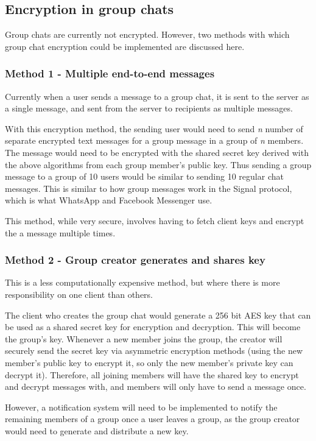 \subsection{Encryption in group chats}
\label{encryption-groups}
Group chats are currently not encrypted. However, two methods with which group chat encryption could be implemented are discussed here.

\subsubsection{Method 1 - Multiple end-to-end messages}
Currently when a user sends a message to a group chat, it is sent to the server as a single message, and sent from the server to recipients as multiple messages. 

With this encryption method, the sending user would need to send \textit{n} number of separate encrypted text messages for a group message in a group of \textit{n} members. The message would need to be encrypted with the shared secret key derived with the above algorithms from each group member's public key. Thus sending a group message to a group of 10 users would be similar to sending 10 regular chat messages. This is similar to how group messages work in the Signal protocol\cite{signal_groups}, which is what WhatsApp and Facebook Messenger use.

This method, while very secure, involves having to fetch client keys and encrypt the a message multiple times.

\subsubsection{Method 2 - Group creator generates and shares key}

This is a less computationally expensive method, but where there is more responsibility on one client than others.

The client who creates the group chat would generate a 256 bit AES key that can be used as a shared secret key for encryption and decryption. This will become the group's key. Whenever a new member joins the group, the creator will securely send the secret key via asymmetric encryption methods (using the new member's public key to encrypt it, so only the new member's private key can decrypt it). Therefore, all joining members will have the shared key to encrypt and decrypt messages with, and members will only have to send a message once.

However, a notification system will need to be implemented to notify the remaining members of a group once a user leaves a group, as the group creator would need to generate and distribute a new key.

